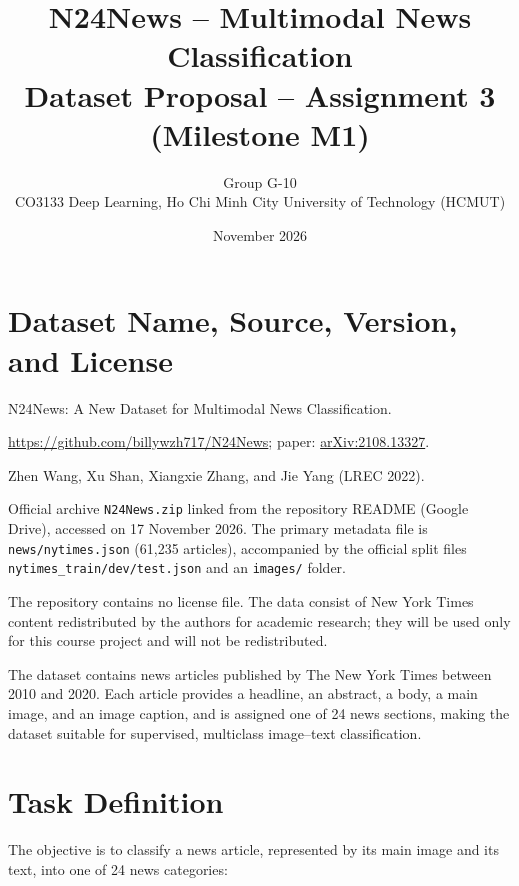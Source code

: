\documentclass[11pt,a4paper]{article}
\title{\textbf{N24News -- Multimodal News Classification}\\[4pt]\large Dataset Proposal -- Assignment 3 (Milestone M1)}
\author{Group G-10\\[2pt]\small CO3133 Deep Learning, Ho Chi Minh City University of Technology (HCMUT)}
\date{November 2026}
\begin{document}
\maketitle

\section{Dataset Name, Source, Version, and License}

\begin{description}[leftmargin=0pt,itemsep=1pt]
\item[Dataset name:] N24News: A New Dataset for Multimodal News Classification.
\item[Source:] \url{https://github.com/billywzh717/N24News}; paper: \href{https://arxiv.org/abs/2108.13327}{arXiv:2108.13327}.
\item[Authors:] Zhen Wang, Xu Shan, Xiangxie Zhang, and Jie Yang (LREC 2022).
\item[Version:] Official archive \texttt{N24News.zip} linked from the repository README (Google Drive), accessed on 17 November 2026. The primary metadata file is \texttt{news/nytimes.json} (61,235 articles), accompanied by the official split files \texttt{nytimes\_train/dev/test.json} and an \texttt{images/} folder.
\item[License:] The repository contains no license file. The data consist of New York Times content redistributed by the authors for academic research; they will be used only for this course project and will not be redistributed.
\end{description}

The dataset contains news articles published by The New York Times between 2010 and 2020. Each article provides a headline, an abstract, a body, a main image, and an image caption, and is assigned one of 24 news sections, making the dataset suitable for supervised, multiclass image--text classification.

\section{Task Definition}

The objective is to classify a news article, represented by its main image and its text, into one of 24 news categories:
\end{document}
